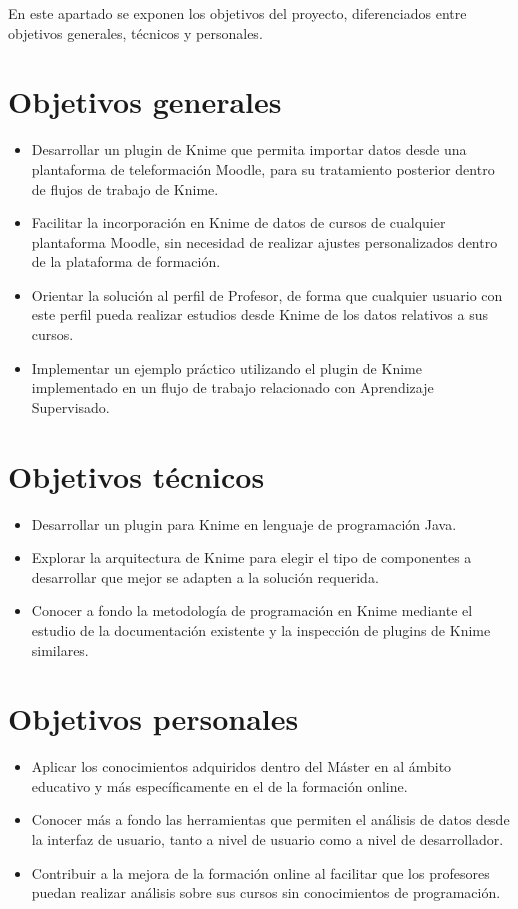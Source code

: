 En este apartado se exponen los objetivos del proyecto, diferenciados entre objetivos generales, técnicos y personales. 

\section{Objetivos generales}

\begin{itemize}
	\item Desarrollar un plugin de Knime que permita importar datos desde una plantaforma de teleformación Moodle, para su tratamiento posterior dentro de flujos de trabajo de Knime.
	\item Facilitar la incorporación en Knime de datos de cursos de cualquier plantaforma Moodle, sin necesidad de realizar ajustes personalizados dentro de la plataforma de formación. 
    \item Orientar la solución al perfil de Profesor, de forma que cualquier usuario con este perfil pueda realizar estudios desde Knime de los datos relativos a sus cursos. 
    \item Implementar un ejemplo práctico utilizando el plugin de Knime implementado en un flujo de trabajo relacionado con Aprendizaje Supervisado.
\end{itemize}

\section{Objetivos técnicos}

\begin{itemize}
	\item Desarrollar un plugin para Knime en lenguaje de programación Java. 
	\item Explorar la arquitectura de Knime para elegir el tipo de componentes a desarrollar que mejor se adapten a la solución requerida.
	\item Conocer a fondo la metodología de programación en Knime mediante el estudio de la documentación existente y la inspección de plugins de Knime similares.
\end{itemize}

\section{Objetivos personales}

\begin{itemize}
	\item Aplicar los conocimientos adquiridos dentro del Máster en al ámbito educativo y más específicamente en el de la formación online. 
	\item Conocer más a fondo las herramientas que permiten el análisis de datos desde la interfaz de usuario, tanto a nivel de usuario como a nivel de desarrollador. 
    \item Contribuir a la mejora de la formación online al facilitar que los profesores puedan realizar análisis sobre sus cursos sin conocimientos de programación. 
\end{itemize}
